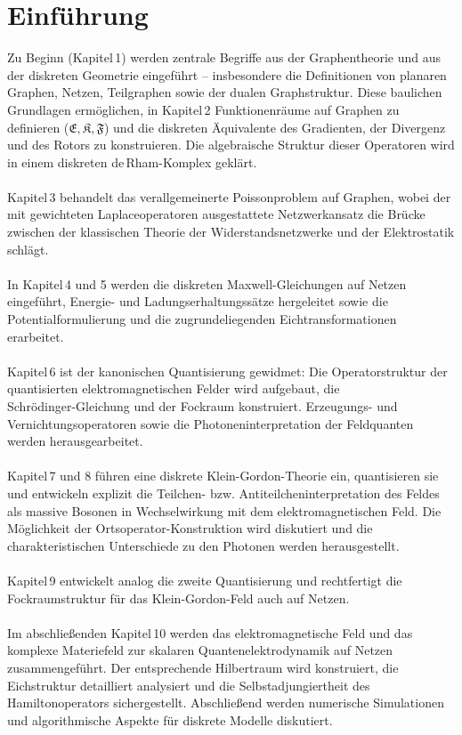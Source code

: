 \documentclass[11pt,a4paper,leqno]{report}
\numberwithin{equation}{chapter}
\begin{document}
\chapter*{Einf\"uhrung}
Zu Beginn (Kapitel 1) werden zentrale Begriffe aus der Graphentheorie und aus der diskreten Geometrie eingeführt – insbesondere die Definitionen von planaren Graphen, Netzen, Teilgraphen sowie der dualen Graphstruktur. Diese baulichen Grundlagen ermöglichen, in Kapitel 2 Funktionenräume auf Graphen zu definieren ($\mathfrak{E},\mathfrak{K},\mathfrak{F}$) und die diskreten Äquivalente des Gradienten, der Divergenz und des Rotors zu konstruieren. Die algebraische Struktur dieser Operatoren wird in einem diskreten de Rham-Komplex geklärt.\\
\\
Kapitel 3 behandelt das verallgemeinerte Poissonproblem auf Graphen, wobei der mit gewichteten Laplaceoperatoren ausgestattete Netzwerkansatz die Brücke zwischen der klassischen Theorie der Widerstandsnetzwerke und der Elektrostatik schlägt.\\
\\
In Kapitel 4 und 5 werden die diskreten Maxwell-Gleichungen auf Netzen eingeführt, Energie- und Ladungserhaltungssätze hergeleitet sowie die Potentialformulierung und die zugrundeliegenden Eichtransformationen erarbeitet.\\
\\
Kapitel 6 ist der kanonischen Quantisierung gewidmet: Die Operatorstruktur der quantisierten elektromagnetischen Felder wird aufgebaut, die \\Schrödinger-Gleichung und der Fockraum konstruiert. Erzeugungs- und Vernichtungsoperatoren sowie die Photoneninterpretation der Feldquanten werden herausgearbeitet.\\
\\
Kapitel 7 und 8 führen eine diskrete Klein-Gordon-Theorie ein, quantisieren sie und entwickeln explizit die Teilchen- bzw. Antiteilcheninterpretation des Feldes als massive Bosonen in Wechselwirkung mit dem elektromagnetischen Feld. Die Möglichkeit der Ortsoperator-Konstruktion wird diskutiert und die charakteristischen Unterschiede zu den Photonen werden herausgestellt.\\
\\
Kapitel 9 entwickelt analog die zweite Quantisierung und rechtfertigt die Fockraumstruktur für das Klein-Gordon-Feld auch auf Netzen.\\
\\
Im abschließenden Kapitel 10 werden das elektromagnetische Feld und das komplexe Materiefeld zur skalaren Quantenelektrodynamik auf Netzen zusammengeführt. Der entsprechende Hilbertraum wird konstruiert, die Eichstruktur detailliert analysiert und die Selbstadjungiertheit des Hamiltonoperators sichergestellt. Abschließend werden numerische Simulationen und algorithmische Aspekte für diskrete Modelle diskutiert.
\end{document}
